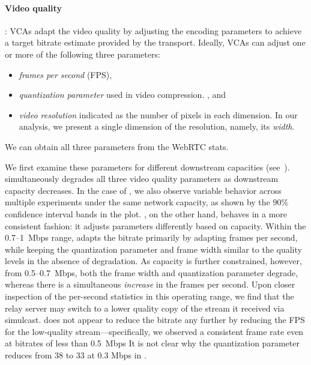 \paragraph{Video quality}: VCAs adapt the video quality by adjusting the
encoding parameters to achieve a target bitrate estimate provided by the
transport. Ideally, VCAs can adjust one or more of the following three
parameters: 
\begin{itemize}
    \itemsep=-1pt
    \item \emph{frames per second} (FPS), 
    \item \textit{quantization parameter} used in video compression. , and  
    \item \textit{video resolution} indicated as the number of pixels in each dimension. In our analysis, we present a single
dimension of the resolution, namely, its \textit{width}. 
\end{itemize}
\noindent

We can obtain all three
parameters from the WebRTC stats. 

We first examine  these parameters for different downstream 
capacities
(see~).
\teamsbrowser simultaneously degrades all three video quality parameters as
downstream capacity decreases. In the case of \teamsbrowser, we also observe
variable behavior across multiple experiments under the same network capacity,
as shown by the $90\%$ confidence interval bands in the plot. \meet, on the
other hand, behaves in a more consistent fashion: it adjusts parameters
differently based on capacity. Within the  0.7--1~Mbps range, \meet adapts the
bitrate primarily by adapting {frames per second}, while keeping the
{quantization parameter} and {frame width} similar to the quality levels in
the absence of degradation. As capacity is further constrained, however,
from 0.5--0.7~Mbps, both the {frame width} and {quantization parameter}
degrade, whereas there is a simultaneous {\em increase} in the frames per
second. Upon closer inspection of the per-second statistics in this operating
range, we find that the relay server may switch to a lower quality copy of the
stream it received via {simulcast}. \meet does not appear to reduce the
bitrate any further by reducing the FPS for the low-quality
stream---specifically, we observed a consistent frame rate even at bitrates of
less than 0.5~Mbps It is not clear why the quantization parameter reduces
from 38 to 33 at 0.3 Mbps in \meet.

